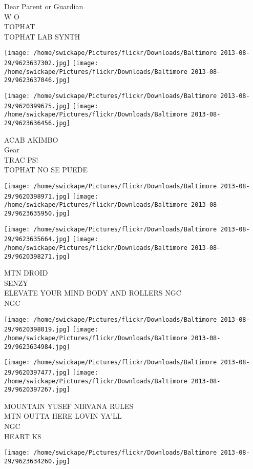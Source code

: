 \documentclass[10pt,letterpaper]{article}
\begin{document}
Dear Parent or Guardian\\
W O\\
TOPHAT\\
TOPHAT LAB SYNTH
\pagebreak

\texttt{[image: /home/swickape/Pictures/flickr/Downloads/Baltimore 2013-08-29/9623637302.jpg]}
\texttt{[image: /home/swickape/Pictures/flickr/Downloads/Baltimore 2013-08-29/9623637046.jpg]}

\texttt{[image: /home/swickape/Pictures/flickr/Downloads/Baltimore 2013-08-29/9620399675.jpg]}
\texttt{[image: /home/swickape/Pictures/flickr/Downloads/Baltimore 2013-08-29/9623636456.jpg]}

ACAB AKIMBO\\
Gear\\
TRAC PS!\\
TOPHAT NO SE PUEDE
\pagebreak

\texttt{[image: /home/swickape/Pictures/flickr/Downloads/Baltimore 2013-08-29/9620398971.jpg]}
\texttt{[image: /home/swickape/Pictures/flickr/Downloads/Baltimore 2013-08-29/9623635950.jpg]}

\texttt{[image: /home/swickape/Pictures/flickr/Downloads/Baltimore 2013-08-29/9623635664.jpg]}
\texttt{[image: /home/swickape/Pictures/flickr/Downloads/Baltimore 2013-08-29/9620398271.jpg]}

MTN DROID\\
SENZY\\
ELEVATE YOUR MIND BODY AND ROLLERS NGC\\
NGC
\pagebreak

\texttt{[image: /home/swickape/Pictures/flickr/Downloads/Baltimore 2013-08-29/9620398019.jpg]}
\texttt{[image: /home/swickape/Pictures/flickr/Downloads/Baltimore 2013-08-29/9623634984.jpg]}

\texttt{[image: /home/swickape/Pictures/flickr/Downloads/Baltimore 2013-08-29/9620397477.jpg]}
\texttt{[image: /home/swickape/Pictures/flickr/Downloads/Baltimore 2013-08-29/9620397267.jpg]}

MOUNTAIN YUSEF NIRVANA RULES\\
MTN OUTTA HERE LOVIN YA'LL\\
NGC\\
HEART K8
\pagebreak

\texttt{[image: /home/swickape/Pictures/flickr/Downloads/Baltimore 2013-08-29/9623634260.jpg]}
\end{document}
